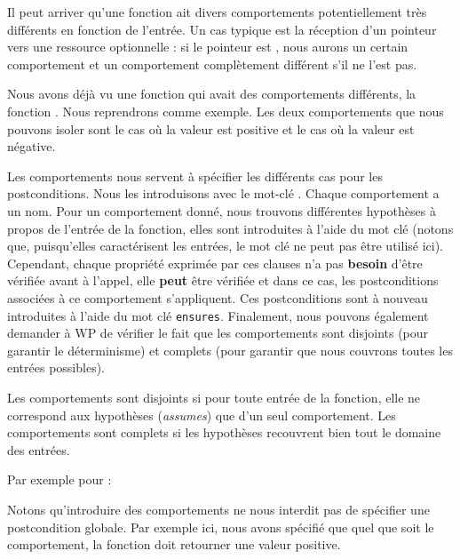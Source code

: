 Il peut arriver qu'une fonction ait divers comportements potentiellement très
différents en fonction de l'entrée. Un cas typique est la réception d'un
pointeur vers une ressource optionnelle : si le pointeur est , nous
aurons un certain comportement et un comportement complètement différent s'il ne
l'est pas.



Nous avons déjà vu une fonction qui avait des comportements différents, la
fonction . Nous reprendrons comme exemple. Les deux
comportements que nous pouvons isoler sont le cas où la valeur est positive et
le cas où la valeur est négative.



Les comportements nous servent à spécifier les différents cas pour les
postconditions. Nous les introduisons avec le mot-clé .
Chaque comportement a un nom. Pour un comportement donné, nous trouvons
différentes hypothèses à propos de l'entrée de la fonction, elles sont
introduites à l'aide du mot clé  (notons que, puisqu'elles
caractérisent les entrées, le mot clé  ne peut
pas être utilisé ici). Cependant, chaque propriété exprimée par ces clauses
n'a pas \textbf{besoin} d'être vérifiée avant à l'appel, elle \textbf{peut}
être vérifiée et dans ce cas, les postconditions associées à ce comportement
s'appliquent. Ces postconditions sont à nouveau introduites à l'aide du mot
clé \texttt{ensures}. Finalement, nous pouvons également demander à WP
de vérifier le fait que les comportements sont disjoints (pour garantir
le déterminisme) et complets (pour garantir que nous couvrons toutes les
entrées possibles).



Les comportements sont disjoints si pour toute entrée de la fonction, elle ne
correspond aux hypothèses (\textit{assumes}) que d'un seul comportement. Les
comportements sont complets si les hypothèses recouvrent bien tout le domaine
des entrées.



Par exemple pour  :





Notons qu'introduire des comportements ne nous interdit pas de spécifier une
postcondition globale. Par exemple ici, nous avons spécifié que quel que soit
le comportement, la fonction doit retourner une valeur positive.


